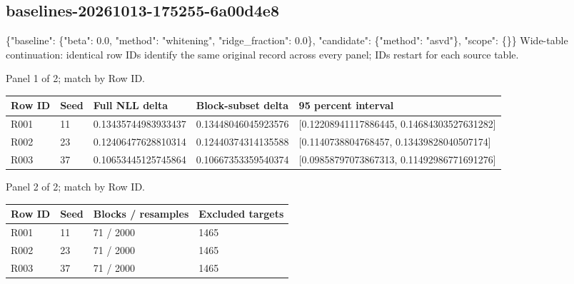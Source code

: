 \documentclass[10pt]{article}
\begin{document}
\subsection{baselines-20261013-175255-6a00d4e8}
\{"baseline": \{"beta": 0.0, "method": "whitening", "ridge\_fraction": 0.0\}, "candidate": \{"method": "asvd"\}, "scope": \{\}\}
Wide-table continuation: identical row IDs identify the same original record across every panel; IDs restart for each source table.
\par\noindent Panel 1 of 2; match by Row ID.
{\scriptsize\setlength{\tabcolsep}{2pt}
\begin{longtable}{p{}p{}p{}p{}p{}}
Row ID & Seed & Full NLL delta & Block-subset delta & 95 percent interval \\
\hline\endhead
R001 & 11 & 0.13435744983933437 & 0.13448046045923576 & [0.12208941117886445, 0.14684303527631282] \\
R002 & 23 & 0.12406477628810314 & 0.12440374314135588 & [0.1140738804768457, 0.13439828040507174] \\
R003 & 37 & 0.10653445125745864 & 0.10667353359540374 & [0.09858797073867313, 0.11492986771691276] \\
\end{longtable}}
\par\noindent Panel 2 of 2; match by Row ID.
{\scriptsize\setlength{\tabcolsep}{2pt}
\begin{longtable}{p{}p{}p{}p{}}
Row ID & Seed & Blocks / resamples & Excluded targets \\
\hline\endhead
R001 & 11 & 71 / 2000 & 1465 \\
R002 & 23 & 71 / 2000 & 1465 \\
R003 & 37 & 71 / 2000 & 1465 \\
\end{longtable}}
\end{document}
